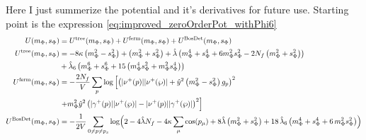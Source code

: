 Here I just summerize the potential and it's derivatives for future use. Starting point is the expression \eqref{eq:improved_zeroOrderPot_withPhi6}
\begin{align}\label{eq:CEP_shortCut}
 U(m_{\Phi}, s_{\Phi}) &= U^{\text{tree}}(m_{\Phi}, s_{\Phi}) + U^{\text{ferm}}(m_{\Phi}, s_{\Phi}) + U^{\text{BosDet}}(m_{\Phi}, s_{\Phi}) 
              \\ \label{CEP_treeLevel}
 U^{\text{tree}}(m_{\Phi}, s_{\Phi}) &= -8 \kappa \left( m_{\Phi}^2 - s_{\Phi}^2 \right)   +   \left( m_{\Phi}^2 + s_{\Phi}^2 \right)
                         + \hat\lambda \left( m_{\Phi}^4 + s_{\Phi}^4 + 6 m_{\Phi}^2 s_{\Phi}^2 - 2 N_f \left(m_{\Phi}^2 + s_{\Phi}^2 \right) \right) 
              \nonumber \\
                         & + \hat\lambda_6 \left( m_{\Phi}^6 + s_{\Phi}^6 + 15 \left( m_{\Phi}^4 s_{\Phi}^2 + m_{\Phi}^2 s_{\Phi}^4 \right)   \right)
              \\ \label{eq:CEP_ferionicContribution}
 U^{\text{ferm}}(m_{\Phi}, s_{\Phi}) &= -\frac{2N_f}{V} \sum\limits_p \log
                                    \left[ \left( |\nu^+(p)| |\nu^+(\wp)|   +
                                    \hat y ^2 \left( m_{\Phi}^2 - s_{\Phi}^2 \right) g_p\right)^2 
                                              \nonumber \right. \\ 
                        & \left. +  m_{\Phi}^2 \hat y^2 \left( |\gamma^+(p)| |\nu^+(\wp)|   -   |\nu^+(p)| |\gamma^+(\wp)| \right)^2\right] 
                                              \\ \label{eq:CEP_bosonicDeterminantContribution}
 U^{\text{BosDet}}(m_{\Phi}, s_{\Phi}) &= - \frac{1}{2V}\sum\limits_{0 \neq p \neq p_s} 
                        \log\Bigl( 2 - 4 \hat\lambda N_f - 4 \kappa \sum_{\mu} \cos(p_{\mu}) + 8 \hat\lambda \left( m_{\Phi}^2 + s_{\Phi}^2  \right) 
                        + 18\, \hat\lambda_6\left( m_{\Phi}^4 + s_{\Phi}^4 + 6\,  m_{\Phi}^2 s_{\Phi}^2 \right)\Bigr)
\end{align}

